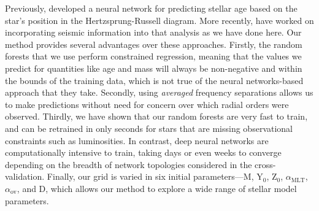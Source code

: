 \documentclass[twocolumn,twocolappendix]{aastex6}
\begin{document}
Previously, \citet{pulone1997age} developed a neural network for predicting stellar age based on the star's position in the Hertzsprung-Russell diagram. More recently, \citet{2016arXiv160200902V} have worked on incorporating seismic information into that analysis as we have done here. Our method provides several advantages over these approaches. Firstly, the random forests that we use perform constrained regression, meaning that the values we predict for quantities like age and mass will always be non-negative and within the bounds of the training data, which is not true of the neural networks-based approach that they take. Secondly, using \emph{averaged} frequency separations allows us to make predictions without need for concern over which radial orders were observed. Thirdly, we have shown that our random forests are very fast to train, and can be retrained in only seconds for stars that are missing observational constraints such as luminosities. In contrast, deep neural networks are computationally intensive to train, taking days or even weeks to converge depending on the breadth of network topologies considered in the cross-validation. Finally, our grid is varied in six initial parameters---M, Y$_0$, Z$_0$, $\alpha_{\text{MLT}}$, $\alpha_{\text{ov}}$, and D, which allows our method to explore a wide range of stellar model parameters.


\end{document}
